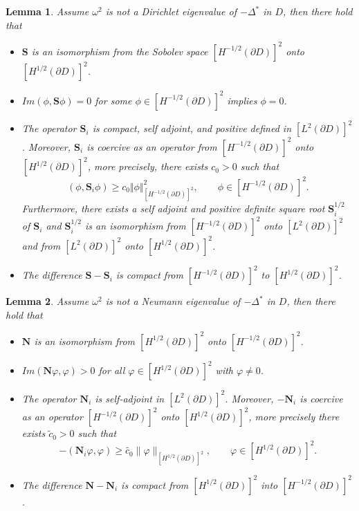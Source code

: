 \documentclass[11pt,reqno,twoside]{amsart}
\newtheorem{lem}{Lemma}[section]
\theoremstyle{definition}
\theoremstyle{remark}
\numberwithin{equation}{section}
\begin{document}
	 \begin{lem}\label{SProperty}
	 	Assume $\omega^2$ is not a Dirichlet eigenvalue of $-\Delta^*$ in $D$, then there hold that
	 	\begin{itemize}
	 		\item [(1).] $\mathbf S$ is an isomorphism from the Sobolev space $\left[H^{-1/2}\left(\partial D\right) \right] ^2 $ onto $\left[H^{1/2}\left(\partial D\right) \right] ^2$.
	 		\item [(2).] $Im\left( \phi,\mathbf S\phi\right) =0$ for some $\phi \in \left[H^{-1/2}\left(\partial D\right) \right] ^2$ implies $\phi=0$.
	 		\item [(3).] The operator $\mathbf S_i$ is compact, self adjoint, and positive defined  in $\left[L^2\left(\partial D\right) \right] ^2 $. Moreover, $\mathbf S_i$ is coercive as an operator from $\left[H^{-1/2}\left(\partial D\right) \right] ^2 $ onto $\left[H^{1/2}\left(\partial D\right) \right] ^2$, more precisely, there exists $c_0>0$ such that
	 		$$
	 		\left( \phi,\mathbf S_i \phi\right) \geq c_0\Vert \phi\Vert^2_{\left[H^{-1/2}\left(\partial D\right) \right] ^2}, \qquad \phi \in \left[H^{-1/2}\left(\partial D\right) \right] ^2.
	 		$$
	 		Furthermore, there exists a self adjoint and positive definite square root $\mathbf S_{i}^{1/2}$ of $\mathbf S_i$ and $\mathbf S_{i}^{1/2}$ is an isomorphism from $\left[H^{-1/2}\left(\partial D\right) \right] ^2 $ onto $\left[L^2\left(\partial D\right) \right] ^2 $ and from $\left[L^2\left(\partial D\right) \right] ^2 $ onto $\left[H^{1/2}\left(\partial D\right) \right] ^2 $.
	 		\item [(4).] The difference $\mathbf S - \mathbf S_i$ is compact from $\left[H^{-1/2}\left(\partial D\right) \right] ^2 $ to $\left[H^{1/2}\left(\partial D\right) \right] ^2$.
	 	\end{itemize}
	 \end{lem}
	 
	 \begin{lem}\label{NProperty}
	 Assume $\omega^2$ is not a Neumann eigenvalue of $-\Delta^*$ in $D$, then there hold that
	 	\begin{itemize}
	 		\item [(1).] $\mathbf{N}$ is an isomorphism from $[H^{1/2}(\partial D)]^2$ onto $[H^{-1/2}(\partial D)]^2$.
	 		\item [(2).] $Im(\mathbf{N}\varphi, \varphi) > 0$ for all $\varphi \in [H^{1/2}(\partial D)]^2$ with $\varphi \neq 0$.
	 		\item [(3).] The operator $\mathbf{N}_i$ is self-adjoint in $[L^2(\partial D)]^2$. Moreover, $-\mathbf{N}_i$ is coercive as an operator $\left[H^{-1/2}\left(\partial D\right) \right] ^2 $ onto $\left[H^{1/2}\left(\partial D\right) \right] ^2$, more precisely there exists $\tilde{c}_0>0$ such that
			\[
	 		-(\mathbf{N}_i\varphi, \varphi) \geq \tilde{c_0} \|\varphi\|_{[H^{1/2}(\partial D)]^2}, \qquad \varphi \in [H^{1/2}(\partial D)]^2.
	 		\]
			\item [(4).] The difference $\mathbf{N} - \mathbf{N}_i$ is compact from $[H^{1/2}(\partial D)]^2$ into $[H^{-1/2}(\partial D)]^2$.
		\end{itemize}
	 \end{lem}
\end{document}
